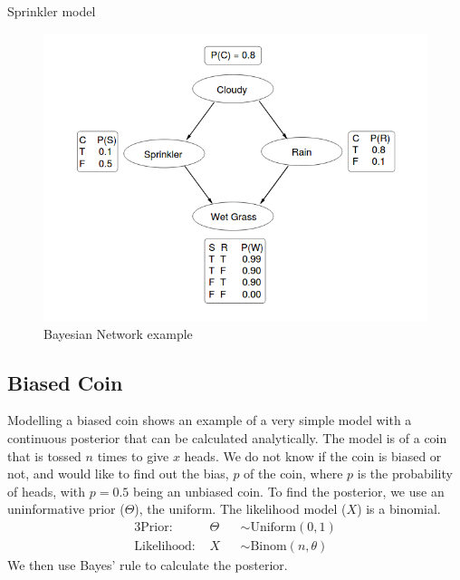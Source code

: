 	
\begin{listing}[!ht]
	\caption{Sprinkler model}
	\label{lst:sprinkler}
\end{listing}
	
	
\begin{figure}[!htb]
	\centering
	\includegraphics[width=\textwidth]{figs/sprinkler-network.png}
	\caption{Bayesian Network example}
	\label{fig:sprinkler-network}
\end{figure}
	
\subsection{Biased Coin}
Modelling a biased coin shows an example of a very simple model with a continuous posterior that can be calculated analytically\cite{datasci}. 
% 
The model is of a coin that is tossed $n$ times to give $x$ heads. We do not know if the coin is biased or not, and would like to find out the bias, $p$ of the coin, where $p$ is the probability of heads, with $p=0.5$ being an unbiased coin.
% 
To find the posterior, we use an uninformative prior ($\Theta$), the uniform. The likelihood model ($X$) is a binomial.
% 
\begin{alignat*}{3}
	\text{Prior:~}      & \Theta &   & \sim \text{Uniform}(0,1)    \\
	\text{Likelihood:~} & X      &   & \sim \text{Binom}(n,\theta) 
\end{alignat*}
% 
We then use Bayes' rule to calculate the posterior.
				    
